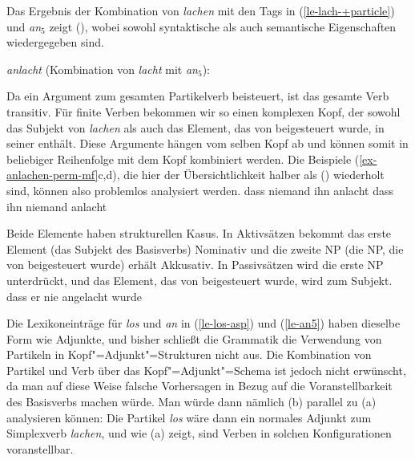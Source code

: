 Das Ergebnis der Kombination von \emph{lachen} mit den Tags in (\ref{le-lach-+particle}) und
\emph{an$_5$} zeigt (), wobei sowohl syntaktische als auch semantische Eigenschaften
wiedergegeben sind.

\eas
\emph{anlacht} (Kombination von \emph{lacht} mit \emph{an$_5$}):\\
\zs

\noindent
Da \anf ein Argument zum gesamten Partikelverb beisteuert, ist das gesamte Verb transitiv.
Für finite Verben bekommen wir so einen komplexen Kopf, der sowohl das Subjekt von \emph{lachen}
als auch das Element, das von \anf beigesteuert wurde, in seiner \compsl enthält.
Diese Argumente hängen vom selben Kopf ab und können somit in beliebiger Reihenfolge
mit dem Kopf kombiniert werden. Die Beispiele (\ref{ex-anlachen-perm-mf}c,d), die hier
der Übersichtlichkeit halber als () wiederholt sind, können also problemlos analysiert werden.
\eal
\ex
dass    niemand           ihn           anlacht
\ex
dass    ihn           niemand          anlacht
\zl

\noindent
Beide Elemente haben strukturellen Kasus. In Aktivsätzen bekommt das erste Element (das Subjekt des Basisverbs)
Nominativ und die zweite NP (die NP, die von \anf beigesteuert wurde) erhält Akkusativ.
In Passivsätzen wird die erste NP unterdrückt, und das Element, das von \anf beigesteuert wurde,
wird zum Subjekt.
\ea
dass    er       nie   angelacht          wurde
\z

\noindent
Die Lexikoneinträge für \emph{los} und \emph{an} in (\ref{le-los-asp}) und (\ref{le-an5})
haben dieselbe Form wie Adjunkte, und bisher schließt die Grammatik die Verwendung von Partikeln
in Kopf"=Adjunkt"=Strukturen nicht aus. Die Kombination von Partikel und Verb über das
Kopf"=Adjunkt"=Schema ist jedoch nicht erwünscht, da man auf diese Weise falsche Vorhersagen in Bezug
auf die Voranstellbarkeit des Basisverbs machen würde. Man würde dann nämlich (b) parallel
zu (a) analysieren können:
\eal
{}
\zl
Die Partikel \emph{los} wäre dann ein normales Adjunkt zum Simplexverb \emph{lachen},
und wie (a) zeigt, sind Verben in solchen Konfigurationen voranstellbar.

